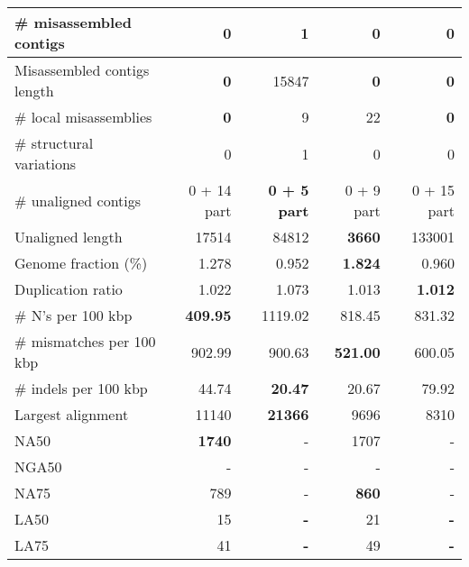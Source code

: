\documentclass[12pt,a4paper]{article}
\begin{document}
\begin{table}[ht]
\begin{center}
\begin{tabular}{|l*{4}{|r}|}
\# misassembled contigs & {\bf 0} & 1 & {\bf 0} & {\bf 0} \\ \hline
Misassembled contigs length & {\bf 0} & 15847 & {\bf 0} & {\bf 0} \\ \hline
\# local misassemblies & {\bf 0} & 9 & 22 & {\bf 0} \\ \hline
\# structural variations & 0 & 1 & 0 & 0 \\ \hline
\# unaligned contigs & 0 + 14 part & {\bf 0 + 5 part} & 0 + 9 part & 0 + 15 part \\ \hline
Unaligned length & 17514 & 84812 & {\bf 3660} & 133001 \\ \hline
Genome fraction (\%) & 1.278 & 0.952 & {\bf 1.824} & 0.960 \\ \hline
Duplication ratio & 1.022 & 1.073 & 1.013 & {\bf 1.012} \\ \hline
\# N's per 100 kbp & {\bf 409.95} & 1119.02 & 818.45 & 831.32 \\ \hline
\# mismatches per 100 kbp & 902.99 & 900.63 & {\bf 521.00} & 600.05 \\ \hline
\# indels per 100 kbp & 44.74 & {\bf 20.47} & 20.67 & 79.92 \\ \hline
Largest alignment & 11140 & {\bf 21366} & 9696 & 8310 \\ \hline
NA50 & {\bf 1740} & - & 1707 & - \\ \hline
NGA50 & - & - & - & - \\ \hline
NA75 & 789 & - & {\bf 860} & - \\ \hline
LA50 & 15 & {\bf -} & 21 & {\bf -} \\ \hline
LA75 & 41 & {\bf -} & 49 & {\bf -} \\ \hline
\end{tabular}
\end{center}
\end{table}
\end{document}
